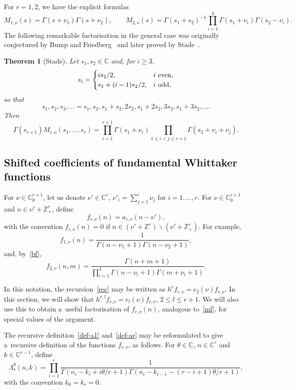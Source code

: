 \documentclass[pdftex]{sigma}
\newtheorem{thm}{Theorem}[section]
\theoremstyle{definition}
\newcommand{\C}{{\mathbb C}}
\newcommand\Z{{\mathbb Z}}
\begin{document}
For $r=1,2$, we have the explicit formulas~\cite{bump,is}
\[M_{1,\nu} (s)=\Gamma(s+\nu_1)\Gamma(s+\nu_2),\qquad
M_{2,\nu}(s)=\Gamma(s_1+s_2)^{-1} \prod_{i=1}^3 \Gamma(s_1+\nu_i) \Gamma(s_2-\nu_i).
\]
The following remarkable factorisation in the general case was
originally conjectured by Bump and Friedberg~\cite{bf}
and later proved by Stade~\cite{stade-ajm}.
\begin{thm}[Stade]\label{stade}
Let $s_1,s_2\in\C$ and, for $i\ge 3$,
\[s_i=\begin{cases} is_2/2, & i \mbox{ \rm even},\\ s_1+(i-1)s_2/2, & i \mbox{ \rm odd},\end{cases}\]
so that
\[s_1,s_2,s_3,\ldots = s_1,s_2,s_1+s_2,2s_2,s_1+2s_2,3s_2,s_1+3s_2,\ldots.\]
Then
\begin{equation}\label{mf}
\Gamma(s_{r+1}) M_{r,\nu}(s_1,\dots,s_r)=
\prod_{i=1}^{r+1} \Gamma(s_1+\nu_i) \prod_{1\le i<j\le r+1} \Gamma(s_2+\nu_i+\nu_j).\end{equation}
\end{thm}

\subsection{Shifted coefficients of fundamental Whittaker functions}\label{fun}

For $\nu\in\C^{r+1}_0$, let us denote $\nu'\in\C^r$, $\nu'_i=\sum_{j=1}^i\nu_j$ for $i=1,\dots,r$.
For $\nu\in\C^{r+1}_0$ and $n\in\nu'+\Z_+^r$, define
\begin{equation}\label{fa} f_{r,\nu}(n)= a_{r,\nu}(n-\nu'), \end{equation}
with the convention $f_{r,\nu}(n)=0$ if $n\in ( \nu'+\Z^r)\backslash(\nu'+\Z_+^r)$.
For example,
\[f_{1,\nu}(n)=\frac1{\Gamma(n-\nu_1+1)\Gamma(n-\nu_2+1)},\]
and, by~\eqref{bf},
\[ f_{2,\nu}(n,m)=\frac{\Gamma(n+m+1)}{\prod_{i=1}^3 \Gamma(n-\nu_i+1)\Gamma(m+\nu_i+1)}.\]

In this notation, the recursion~\eqref{rec} may be written as $h^r f_{r,\nu} = e_2(\nu) f_{r,\nu}$.
In this section, we will show that
$h^{r,l} f_{r,\nu} = e_l(\nu) f_{r,\nu}$, $ 2\le l\le r+1$.
We will also use this to obtain a~useful factorisation of $f_{r,\nu}(n)$, analogous to~\eqref{mf},
for special values of the argument.

The recursive definition~\eqref{def-a1} and~\eqref{def-ar} may be reformulated to give a~recursive
definition of the functions $f_{r,\nu}$, as follows.
For $\theta\in\C$, $n\in \C^{r}$ and $k\in \C^{r-1}$, define
\[
\Lambda^\theta_{r}(n,k)=\prod_{i=1}^{r} \frac1{\Gamma(n_i-k_i+i\theta/r+1) \Gamma(n_i-k_{i-1}-(r-i+1)\theta/r+1)},
\]
with the convention $k_0=k_{r}=0$.
\end{document}

